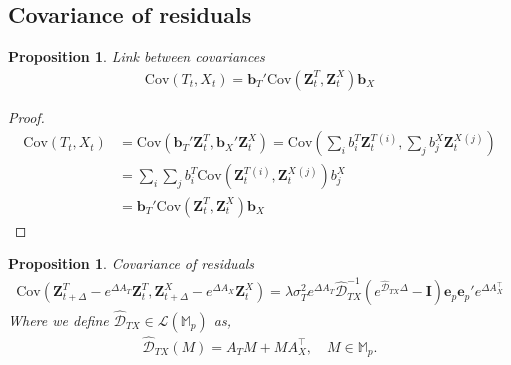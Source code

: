 \documentclass[10pt,a4paper,reqno]{amsart}
\newtheorem{proposition}[theorem]{Proposition}
\theoremstyle{example}
\newcommand{\Cov}{\mathrm{Cov}}
\newcommand{\opI}{\mathbf{I}}
\newcommand{\MM}{\mathbb{M}}
\newcommand{\cL}{\mathcal{L}}
\begin{document}
\subsection{Covariance of residuals}
\begin{proposition} Link between covariances
\begin{align}
    \Cov(T_t,X_t)=\mathbf{b}_T'\Cov(\textbf{Z}_t^T,\textbf{Z}_t^X)\mathbf{b}_X\nonumber
\end{align}
\end{proposition}
\begin{proof}
\begin{align}
\Cov(T_t,X_t)&=\Cov(\mathbf{b}_T'\textbf{Z}_t^T,\mathbf{b}_X'\textbf{Z}_t^X)=\Cov\left(\sum_i b_i^T\textbf{Z}_t^T^{(i)},\sum_j b_j^X\textbf{Z}_t^X^{(j)}\right)\nonumber\\
&=\sum_i\sum_j b_i^T \Cov(\textbf{Z}_t^T^{(i)},\textbf{Z}_t^X^{(j)})b_j^{X}\nonumber\\
&=\mathbf{b}_T'\Cov(\textbf{Z}_t^T,\textbf{Z}_t^X)\mathbf{b}_X\nonumber
\end{align}
\end{proof}
\noindent
\begin{proposition}{Covariance of residuals}
\begin{align}
    \Cov\left(\textbf{Z}_{t+\Delta}^T - e^{\Delta A_T}\textbf{Z}_t^T,\textbf{Z}_{t+\Delta}^X - e^{\Delta A_X}\textbf{Z}_t^X\right)=\lambda\sigma_T^2 e^{\Delta A_T}\hat{\mathcal{D}}^{-1}_{TX}\left(e^{\hat{\mathcal{D}}_{TX}\Delta}-\opI\right)\textbf{e}_p \textbf{e}_p'e^{\Delta A_X^\intercal}\nonumber
\end{align}
Where we define $\hat{\mathcal{D}}_{TX}\in\cL(\MM_p)$ as,
\begin{align*}
    \hat{\mathcal{D}}_{TX}(M)=A_TM+MA_{X}^{\intercal},\quad M\in\MM_p.
\end{align*}
\end{proposition}
\end{document}
